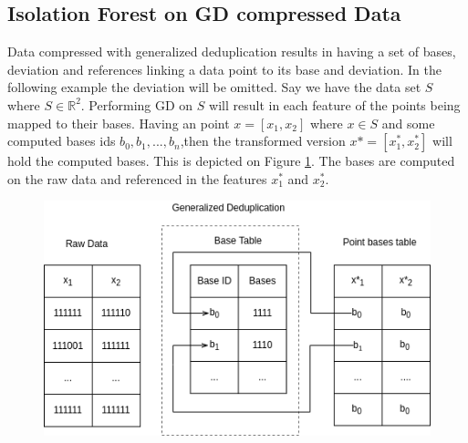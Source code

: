 


\subsection{Isolation Forest on GD compressed Data}
Data compressed with generalized deduplication results in having a set of bases, deviation and references linking a data point to its base and deviation. In the following example the deviation will be omitted. Say we have the data set $S$ where $S \in \mathbb{R}^2$. Performing GD on $S$ will result in each feature of the points being mapped to their bases. Having an point $x = [x_1,x_2]$ where $x \in S$ and some computed bases ids $b_0, b_1, ..., b_n$,then the transformed version $x*=[x^*_1, x^*_2]$ will hold the computed bases. This is depicted on Figure \ref*{fig:gd_points}. The bases are computed on the raw data and referenced in the features $x^*_1$ and $x^*_2$.

\begin{figure}
  \centering
  \includegraphics[width=\linewidth]{../files/test.png}
  \caption{}
  \label{fig:gd_points}
\end{figure}

